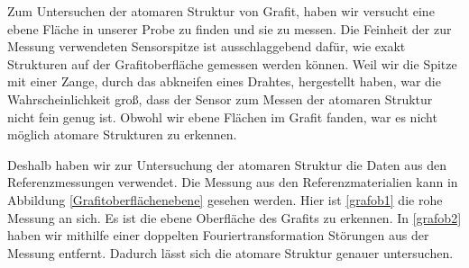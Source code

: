 \documentclass[10pt,a4paper]{article}
\begin{document}
Zum Untersuchen der atomaren Struktur von Grafit, haben wir versucht eine ebene Fläche in unserer Probe zu finden und sie zu messen. Die Feinheit der zur Messung verwendeten Sensorspitze ist ausschlaggebend dafür, wie exakt Strukturen auf der Grafitoberfläche gemessen werden können. Weil wir die Spitze mit einer Zange, durch das abkneifen eines Drahtes, hergestellt haben, war die Wahrscheinlichkeit groß, dass der Sensor zum Messen der atomaren Struktur nicht fein genug ist. Obwohl wir ebene Flächen im Grafit fanden, war es nicht möglich atomare Strukturen zu erkennen.

Deshalb haben wir zur Untersuchung der atomaren Struktur die Daten aus den Referenzmessungen verwendet. Die Messung aus den Referenzmaterialien kann in Abbildung \ref{Grafitoberflächenebene} gesehen werden. Hier ist \ref{grafob1} die rohe Messung an sich. Es ist die ebene Oberfläche des Grafits zu erkennen. In \ref{grafob2} haben wir mithilfe einer doppelten Fouriertransformation Störungen aus der Messung entfernt. Dadurch lässt sich die atomare Struktur genauer untersuchen.
\end{document}
